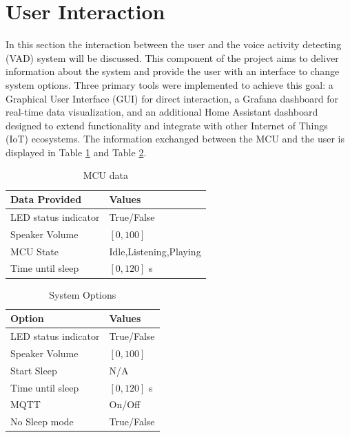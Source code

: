 \section{User Interaction}

In this section the interaction between the user and the voice activity detecting (VAD) system will be discussed. This component of the project aims to deliver information about the system and provide the user with an interface to change system options. Three primary tools were implemented to achieve this goal: a Graphical User Interface (GUI) for direct interaction, a Grafana dashboard for real-time data visualization, and an additional Home Assistant dashboard designed to extend functionality and integrate with other Internet of Things (IoT) ecosystems. The information exchanged between the MCU and the user is displayed in Table \ref{tab:mcuData} and Table \ref{tab:mcuOptions}.

\begin{table}[H]
    \centering
    \caption{MCU data}
    \begin{tabularx}{\textwidth}{
        >{\centering\arraybackslash}X 
        >{\centering\arraybackslash}X 
        }
        \toprule   
        \textbf{Data Provided} & \textbf{Values}\\
        \midrule
        LED status indicator & True/False  \\
        \midrule
        Speaker Volume & $[0,100]$\\
        \midrule
        MCU State & Idle,Listening,Playing\\
        \midrule
        Time until sleep & $[0,120]$ s\\
        \bottomrule
    \end{tabularx}
    \label{tab:mcuData}
\end{table}

\begin{table}[H]
    \centering
    \caption{System Options}
    \begin{tabularx}{\textwidth}{
        >{\centering\arraybackslash}X 
        >{\centering\arraybackslash}X 
        }
        \toprule  
        \textbf{Option} & \textbf{Values}\\
        \midrule
        LED status indicator & True/False \\
        \midrule
        Speaker Volume & $[0,100]$\\
        \midrule
        Start Sleep & N/A \\
        \midrule
        Time until sleep & $[0,120]$ s\\
        \midrule
        MQTT & On/Off \\
        \midrule
        No Sleep mode & True/False \\
        \bottomrule
    \end{tabularx}
    \label{tab:mcuOptions}
\end{table}

